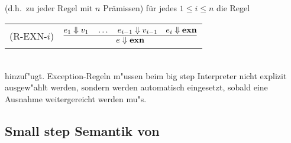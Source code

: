 (d.h.\ zu jeder Regel mit $n$ Pr\"amissen) f\"ur jedes $1 \le i \le n$ die Regel \\[3mm]
   \begin{tabular}{ll}
      \mbox{(R-EXN-$i$)} & $\regel{e_1 \eval v_1 \quad \ldots \quad e_{i-1} \eval v_{i-1} \quad e_i \eval \exn}
                                {e \eval \exn}$ \\[5mm]
   \end{tabular}\\[3mm]
hinzuf"ugt. Exception-Regeln m"ussen beim big step Interpreter nicht explizit ausgew"ahlt werden, sondern werden
automatisch eingesetzt, sobald eine Ausnahme weitergereicht werden mu"s.


\subsection{Small step Semantik von \LONE}

